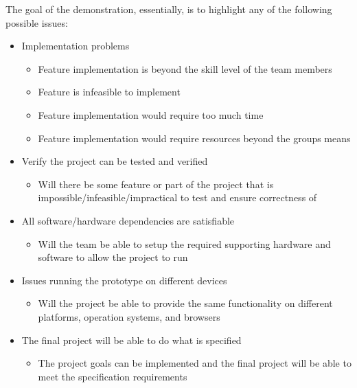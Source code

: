 \documentclass{article}
\begin{document}
The goal of the demonstration, essentially, is to highlight any of the
following possible issues:
\begin{itemize}
  \item Implementation problems
    \begin{itemize}
      \item Feature implementation is beyond the skill level of the team
        members
      \item Feature is infeasible to implement
      \item Feature implementation would require too much time
      \item Feature implementation would require resources beyond the groups
        means
    \end{itemize}
  \item Verify the project can be tested and verified
    \begin{itemize}
      \item Will there be some feature or part of the project that is
        impossible/infeasible/impractical to test and ensure correctness of
    \end{itemize}
  \item All software/hardware dependencies are satisfiable
    \begin{itemize}
      \item Will the team be able to setup the required supporting hardware and
        software to allow the project to run
    \end{itemize}
  \item Issues running the prototype on different devices
    \begin{itemize}
      \item Will the project be able to provide the same functionality on
        different platforms, operation systems, and browsers
    \end{itemize}
  \item The final project will be able to do what is specified
    \begin{itemize}
      \item The project goals can be implemented and the final project will be
        able to meet the specification requirements
    \end{itemize}
\end{itemize}

\end{document}
